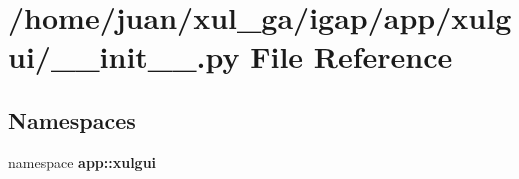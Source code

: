 \section{/home/juan/xul\_\-ga/igap/app/xulgui/\_\-\_\-init\_\-\_\-.py File Reference}
\label{app_2xulgui_2____init_____8py}
\subsection*{Namespaces}
\begin{CompactItemize}
\item 
namespace {\bf app::xulgui}
\end{CompactItemize}
